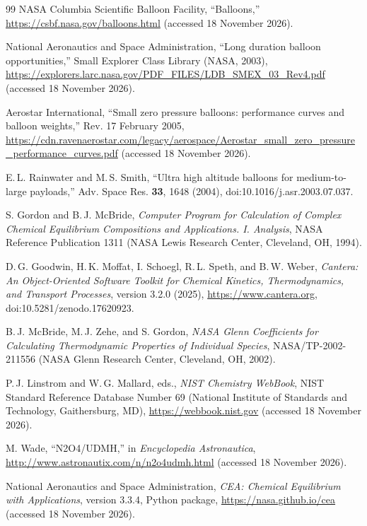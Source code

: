 \documentclass[11pt,a4paper]{article}
\begin{document}
\begin{thebibliography}{99}
 NASA Columbia Scientific Balloon Facility, ``Balloons,'' \url{https://csbf.nasa.gov/balloons.html} (accessed 18 November 2026).

 National Aeronautics and Space Administration, ``Long duration balloon opportunities,'' Small Explorer Class Library (NASA, 2003), \url{https://explorers.larc.nasa.gov/PDF_FILES/LDB_SMEX_03_Rev4.pdf} (accessed 18 November 2026).

 Aerostar International, ``Small zero pressure balloons: performance curves and balloon weights,'' Rev. 17 February 2005, \url{https://cdn.ravenaerostar.com/legacy/aerospace/Aerostar_small_zero_pressure_performance_curves.pdf} (accessed 18 November 2026).

 E.\,L. Rainwater and M.\,S. Smith, ``Ultra high altitude balloons for medium-to-large payloads,'' Adv. Space Res. \textbf{33}, 1648 (2004), doi:10.1016/j.asr.2003.07.037.

 S. Gordon and B.\,J. McBride, \emph{Computer Program for Calculation of Complex Chemical Equilibrium Compositions and Applications. I. Analysis}, NASA Reference Publication 1311 (NASA Lewis Research Center, Cleveland, OH, 1994).

 D.\,G. Goodwin, H.\,K. Moffat, I. Schoegl, R.\,L. Speth, and B.\,W. Weber, \emph{Cantera: An Object-Oriented Software Toolkit for Chemical Kinetics, Thermodynamics, and Transport Processes}, version 3.2.0 (2025), \url{https://www.cantera.org}, doi:10.5281/zenodo.17620923.

 B.\,J. McBride, M.\,J. Zehe, and S. Gordon, \emph{NASA Glenn Coefficients for Calculating Thermodynamic Properties of Individual Species}, NASA/TP-2002-211556 (NASA Glenn Research Center, Cleveland, OH, 2002).

 P.\,J. Linstrom and W.\,G. Mallard, eds., \emph{NIST Chemistry WebBook}, NIST Standard Reference Database Number 69 (National Institute of Standards and Technology, Gaithersburg, MD), \url{https://webbook.nist.gov} (accessed 18 November 2026).

 M. Wade, ``N2O4/UDMH,'' in \emph{Encyclopedia Astronautica}, \url{http://www.astronautix.com/n/n2o4udmh.html} (accessed 18 November 2026).

 National Aeronautics and Space Administration, \emph{CEA: Chemical Equilibrium with Applications}, version 3.3.4, Python package, \url{https://nasa.github.io/cea} (accessed 18 November 2026).


\end{thebibliography}
\end{document}
